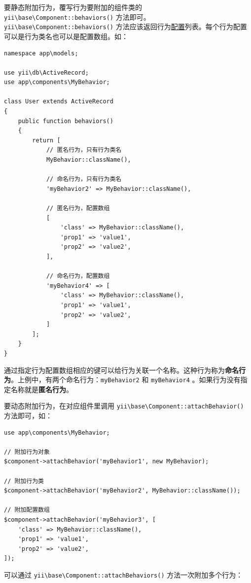 要静态附加行为，覆写行为要附加的组件类的 \texttt{yii{\allowbreak{}\textbackslash}base{\allowbreak{}\textbackslash}Component\allowbreak{}::\allowbreak{}behaviors()} 方法即可。\texttt{yii{\allowbreak{}\textbackslash}base{\allowbreak{}\textbackslash}Component\allowbreak{}::\allowbreak{}behaviors()} 方法应该返回行为\hyperref[basic-configs.md]{配置}列表。每个行为配置可以是行为类名也可以是配置数组。如：

\lstset{language=php}\begin{lstlisting}
namespace app\models;

use yii\db\ActiveRecord;
use app\components\MyBehavior;

class User extends ActiveRecord
{
    public function behaviors()
    {
        return [
            // 匿名行为，只有行为类名
            MyBehavior::className(),

            // 命名行为，只有行为类名
            'myBehavior2' => MyBehavior::className(),

            // 匿名行为，配置数组
            [
                'class' => MyBehavior::className(),
                'prop1' => 'value1',
                'prop2' => 'value2',
            ],

            // 命名行为，配置数组
            'myBehavior4' => [
                'class' => MyBehavior::className(),
                'prop1' => 'value1',
                'prop2' => 'value2',
            ]
        ];
    }
}
\end{lstlisting}
通过指定行为配置数组相应的键可以给行为关联一个名称。这种行为称为\textbf{命名行为}。上例中，有两个命名行为：\lstinline|myBehavior2| 和 \lstinline|myBehavior4| 。如果行为没有指定名称就是\textbf{匿名行为}。

要动态附加行为，在对应组件里调用 \texttt{yii{\allowbreak{}\textbackslash}base{\allowbreak{}\textbackslash}Component\allowbreak{}::\allowbreak{}attachBehavior()} 方法即可，如：

\lstset{language=php}\begin{lstlisting}
use app\components\MyBehavior;

// 附加行为对象
$component->attachBehavior('myBehavior1', new MyBehavior);

// 附加行为类
$component->attachBehavior('myBehavior2', MyBehavior::className());

// 附加配置数组
$component->attachBehavior('myBehavior3', [
    'class' => MyBehavior::className(),
    'prop1' => 'value1',
    'prop2' => 'value2',
]);
\end{lstlisting}
可以通过 \texttt{yii{\allowbreak{}\textbackslash}base{\allowbreak{}\textbackslash}Component\allowbreak{}::\allowbreak{}attachBehaviors()} 方法一次附加多个行为：

